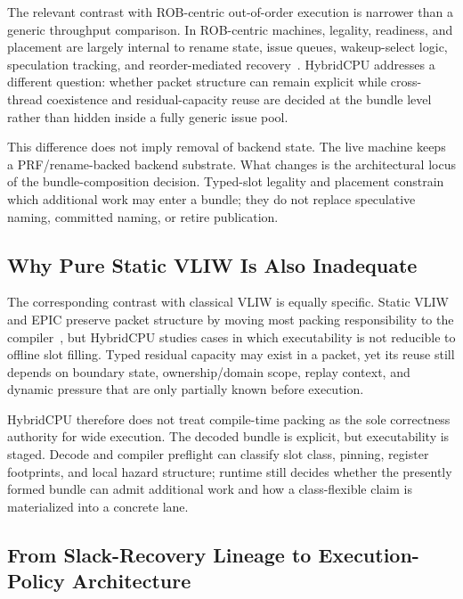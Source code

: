 \documentclass[twocolumn]{article}
\begin{document}
The relevant contrast with ROB-centric out-of-order execution is narrower than a generic throughput comparison. In ROB-centric machines, legality, readiness, and placement are largely internal to rename state, issue queues, wakeup-select logic, speculation tracking, and reorder-mediated recovery~\cite{tomasulo1967efficient,palacharla1997complexity,smith1995microarchitecture}. HybridCPU addresses a different question: whether packet structure can remain explicit while cross-thread coexistence and residual-capacity reuse are decided at the bundle level rather than hidden inside a fully generic issue pool.

This difference does not imply removal of backend state. The live machine keeps a PRF/rename-backed backend substrate. What changes is the architectural locus of the bundle-composition decision. Typed-slot legality and placement constrain which additional work may enter a bundle; they do not replace speculative naming, committed naming, or retire publication.


\subsection{Why Pure Static VLIW Is Also Inadequate}

The corresponding contrast with classical VLIW is equally specific. Static VLIW and EPIC preserve packet structure by moving most packing responsibility to the compiler~\cite{fisher1983vliw,schlansker2000epic,rusu2013poulson}, but HybridCPU studies cases in which executability is not reducible to offline slot filling. Typed residual capacity may exist in a packet, yet its reuse still depends on boundary state, ownership/domain scope, replay context, and dynamic pressure that are only partially known before execution.

HybridCPU therefore does not treat compile-time packing as the sole correctness authority for wide execution. The decoded bundle is explicit, but executability is staged. Decode and compiler preflight can classify slot class, pinning, register footprints, and local hazard structure; runtime still decides whether the presently formed bundle can admit additional work and how a class-flexible claim is materialized into a concrete lane.


\subsection{From Slack-Recovery Lineage to Execution-Policy Architecture}
\end{document}
